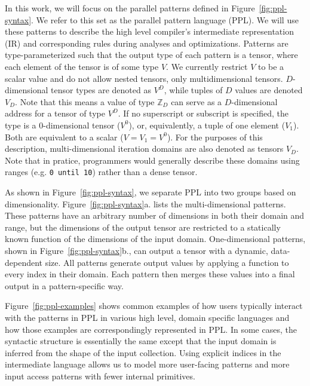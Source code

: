 In this work, we will focus on the parallel patterns defined in Figure~\ref{fig:ppl-syntax}.
We refer to this set as the parallel pattern language (PPL).
We will use these patterns to describe the high level
compiler's intermediate representation (IR) and corresponding rules during analyses and optimizations.
Patterns are type-parameterized such that the output type of each pattern is a tensor, where each
element of the tensor is of some type $V$. We currently restrict $V$ to be a scalar value and
do not allow nested tensors, only multidimensional tensors.
$D$-dimensional tensor types are denoted as $V^D$, while tuples of $D$ values are
denoted $V_D$. Note that this means a value of type $\mathbb{Z}_D$ can serve as a $D$-dimensional address
for a tensor of type $V^D$.
If no superscript or subscript is specified, the type is a 0-dimensional tensor ($V^0$), or, equivalently, a tuple of one element ($V_1$).
Both are equivalent to a scalar ($V = V_1 = V^0$).
For the purposes of this description, multi-dimensional iteration domains are
also denoted as tensors $V_D$. Note that in pratice, programmers would generally
describe these domains using ranges (e.g. \texttt{0 until 10}) rather than a dense tensor.

As shown in Figure~\ref{fig:ppl-syntax}, we separate PPL into two groups based on dimensionality.
Figure~\ref{fig:ppl-syntax}a. lists the multi-dimensional patterns.
These patterns have an arbitrary number of dimensions in both their domain and range,
but the dimensions of the output tensor
are restricted to a statically known function of the dimensions of the input domain.
One-dimensional patterns, shown in Figure~\ref{fig:ppl-syntax}b., can output a tensor with a dynamic, data-dependent size.
All patterns generate output values by applying a function to
every index in their domain. Each pattern then merges these values into a final
output in a pattern-specific way.



Figure~\ref{fig:ppl-examples} shows common examples of how users typically interact with
the patterns in PPL in various high level, domain specific languages
and how those examples are correspondingly represented in PPL. In some cases, the syntactic structure is
essentially the same except that the input domain is inferred from the shape of
the input collection. Using explicit indices in the intermediate language allows
us to model more user-facing patterns and more input access patterns with fewer internal primitives.

